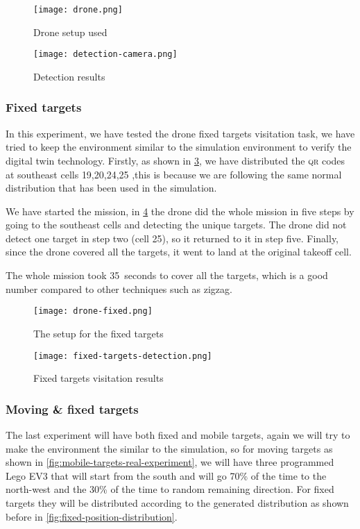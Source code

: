 \documentclass[../main.tex]{subfiles}
\begin{document}
\begin{figure}[H]
	\centering
	\texttt{[image: drone.png]}
	\caption{Drone setup used}
	\label{fig:experiment-drone}
\end{figure} 

\begin{figure}[H]
	\centering
	\texttt{[image: detection-camera.png]}
	\caption{Detection results}
	\label{fig:detection-camera}
\end{figure}

\subsubsection{Fixed targets}
In this experiment, we have tested the drone fixed targets
visitation task, we have tried to keep the environment similar
to the simulation environment to verify the digital twin technology.
Firstly, as shown in \cref{fig:targets-location},
we have distributed the \textsc{qr} codes at southeast cells 
{19,20,24,25} ,this is because we are following 
the same normal distribution that has been used in the simulation.

We have started the mission, in \cref{fig:fixed-location-detection-camera}
the drone did the whole mission in five steps by going
to the southeast cells and detecting the unique targets. 
The drone did not detect one target in 
step two (cell 25), so it returned to it in step five. Finally,
since the drone covered all the targets, it 
went to land at the original takeoff cell.

The whole mission took \SI{35}{seconds} to cover all the targets,
which is a good number compared to other techniques such as zigzag.

\begin{figure}[H]
	\centering
	\texttt{[image: drone-fixed.png]}
	\caption{The setup for the fixed targets}
	\label{fig:targets-location}
\end{figure}


\begin{figure}[H]
	\centering
	\texttt{[image: fixed-targets-detection.png]}
	\caption{Fixed targets visitation results}
	\label{fig:fixed-location-detection-camera}
\end{figure}


\subsubsection{Moving \& fixed targets}
The last experiment will have both fixed and mobile targets,
again we will try to make the environment the similar to the 
simulation, so for moving targets as shown in 
\cref{fig:mobile-targets-real-experiment}, we will have 
three programmed Lego EV3 that will start 
from the south and will go 70\% of the time to the north-west 
and the 30\% of the time to random remaining direction. For fixed
targets they will be distributed according to the generated distribution
as shown before in \cref{fig:fixed-position-distribution}.
\end{document}
